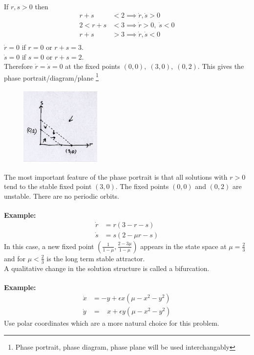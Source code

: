 \documentclass{article}
\begin{document}
\\
If $r,s >0$ then
\begin{align*}
r+s &< 2 \implies \dot{r}, \dot{s} > 0 \\
2 < r+s &< 3 \implies \dot{r} >0 , \; \dot{s} < 0 \\
r+s &> 3 \implies \dot{r}, \dot{s} < 0 \\
\end{align*}
$\dot{r} = 0$ if $r=0$ or $r+s = 3$. \\
$\dot{s} = 0$ if $s=0$ or $r+s = 2$. \\
Therefore $\dot{r} = \dot{s} = 0$ at the fixed points $(0,0), \; (3,0), \; (0,2)$.
This gives the phase portrait/diagram/plane%
\footnote{Phase portrait, phase diagram, phase plane will be used interchangably}
\begin{figure}[H]
\centering
\includegraphics[width=4cm, height=4cm]{fig0.png}
\end{figure}
The most important feature of the phase portrait is that all solutions with 
$r >0$ tend to the stable fixed point $(3,0)$. The fixed points $(0,0)$ and
$(0,2)$ are unstable. There are no periodic orbits.
\\
\\
\textbf{Example:}   
\begin{align*}
\dot{r} &= r(3 - r -s) \\
\dot{s} &= s(2 - \mu r -s)
\end{align*}
In this case, a new fixed point $(\frac{1}{1- \mu} , \frac{2 - 3 \mu}{1- \mu})$
appears in the state space at $\mu = \frac{2}{3}$ and for $\mu < \frac{2}{3}$ 
is the long term stable attractor. 
\\
A qualitative change in the solution structure is called a bifurcation.
\\
\\
\textbf{Example:}   
\begin{align*}
\dot{x} &= -y + \epsilon x (\mu - x^2 - y^2) \\
\dot{y} &= \;\;\; x + \epsilon y (\mu - x^2 - y^2)
\end{align*}
Use polar coordinates which are a more natural choice for this problem.
\end{document}
